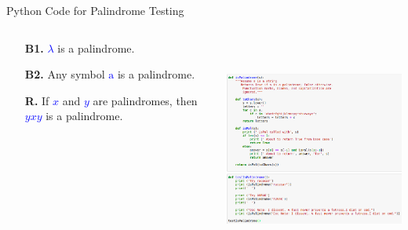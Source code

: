 \documentclass[aspectratio=169]{beamer}
\providecommand{\Blue}[1]{\textcolor{blue}{#1}}
\begin{document}
\begin{frame}[plain]{Python Code for Palindrome Testing}
  \begin{columns}[t] %
     \begin{column}[T]{5cm} %
       \begin{itemize}
          \item[{\bf B1.}] \Blue{$\lambda$} is a palindrome. 
          \item[{\bf B2.}] Any symbol \Blue{$\mathrm{a}$} is a palindrome.
          \item[{\bf R.}] If \Blue{$x$} and \Blue{$y$} are palindromes, then \Blue{$yxy$} is a palindrome.
       \end{itemize}
     \end{column}
     \begin{column}[T]{8cm} %
     \includegraphics[height=7.3cm]{./img/lecture25-fig1.png}    
     \end{column}
     \end{columns}
\end{frame}
\end{document}
